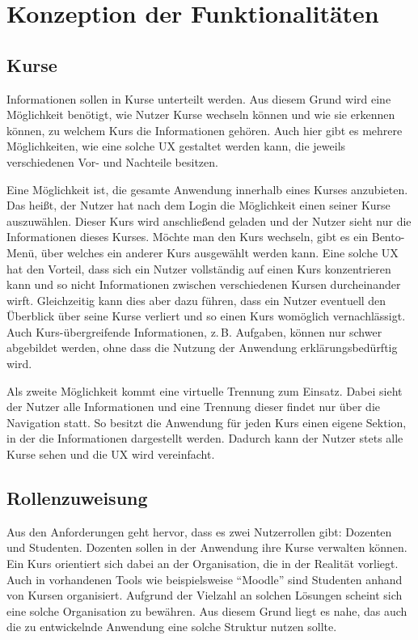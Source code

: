 \section{Konzeption der Funktionalitäten}\label{sec:konzeptionFunktionalitaeten}


\subsection{Kurse}\label{sub:konzeptionKurse}

Informationen sollen in Kurse unterteilt werden.
Aus diesem Grund wird eine Möglichkeit benötigt, wie Nutzer Kurse wechseln können und wie sie erkennen können, zu welchem Kurs die Informationen gehören.
Auch hier gibt es mehrere Möglichkeiten, wie eine solche \ac{UX} gestaltet werden kann, die jeweils verschiedenen Vor- und Nachteile besitzen.

Eine Möglichkeit ist, die gesamte Anwendung innerhalb eines Kurses anzubieten.
Das heißt, der Nutzer hat nach dem Login die Möglichkeit einen seiner Kurse auszuwählen.
Dieser Kurs wird anschließend geladen und der Nutzer sieht nur die Informationen dieses Kurses.
Möchte man den Kurs wechseln, gibt es ein Bento-Menü, über welches ein anderer Kurs ausgewählt werden kann.
Eine solche \ac{UX} hat den Vorteil, dass sich ein Nutzer vollständig auf einen Kurs konzentrieren kann und so nicht Informationen zwischen verschiedenen Kursen durcheinander wirft.
Gleichzeitig kann dies aber dazu führen, dass ein Nutzer eventuell den Überblick über seine Kurse verliert und so einen Kurs womöglich vernachlässigt.
Auch Kurs-übergreifende Informationen, z.\,B. Aufgaben, können nur schwer abgebildet werden, ohne dass die Nutzung der Anwendung erklärungsbedürftig wird.

Als zweite Möglichkeit kommt eine virtuelle Trennung zum Einsatz.
Dabei sieht der Nutzer alle Informationen und eine Trennung dieser findet nur über die Navigation statt.
So besitzt die Anwendung für jeden Kurs einen eigene Sektion, in der die Informationen dargestellt werden.
Dadurch kann der Nutzer stets alle Kurse sehen und die \ac{UX} wird vereinfacht.



\subsection{Rollenzuweisung}

Aus den Anforderungen geht hervor, dass es zwei Nutzerrollen gibt: Dozenten und Studenten.
Dozenten sollen in der Anwendung ihre Kurse verwalten können.
Ein Kurs orientiert sich dabei an der Organisation, die in der Realität vorliegt.
Auch in vorhandenen Tools wie beispielsweise \enquote{Moodle} sind Studenten anhand von Kursen organisiert.
Aufgrund der Vielzahl an solchen Lösungen scheint sich eine solche Organisation zu bewähren.
Aus diesem Grund liegt es nahe, das auch die zu entwickelnde Anwendung eine solche Struktur nutzen sollte.

